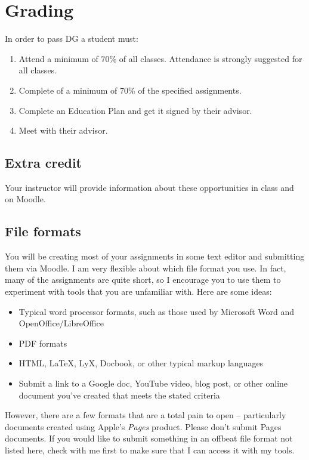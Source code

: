 \documentclass[12pt,article,oneside]{memoir}
\begin{document}
\section{Grading}

In order to pass DG a student must:

\begin{enumerate}
 \item Attend a minimum of 70\% of all classes.  Attendance is strongly suggested for all classes.
 \item Complete of a minimum of 70\% of the specified assignments.
 \item Complete an Education Plan and get it signed by their advisor.
 \item Meet with their advisor.
\end{enumerate}

  
\subsection{Extra credit}
Your instructor will provide information about these opportunities in class and on Moodle.

\subsection{File formats}
You will be creating most of your assignments in some text editor and submitting them via Moodle.  I am very flexible about which file format you use. In fact, many of the assignments are quite short, so I encourage you to use them to experiment with tools that you are unfamiliar with.  Here are some ideas:
\begin{itemize}
 \item Typical word processor formats, such as those used by Microsoft Word and OpenOffice/LibreOffice
 \item PDF formats
 \item HTML, \LaTeX, LyX,  Docbook, or other typical markup languages
 \item Submit a link to a Google doc, YouTube video, blog post, or other online document you've created that meets the stated criteria 
\end{itemize}



However, there are a few formats that are a total pain to open -- particularly documents created using Apple's \emph{Pages} product.  Please don't submit Pages documents. If you would like to submit something in an offbeat file format not listed here, check with me first to make sure that I can access it with my tools.
\end{document}
